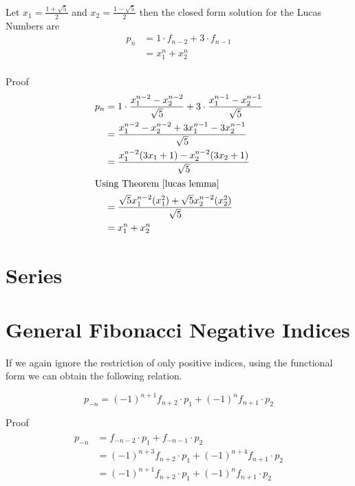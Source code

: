 \documentclass[a4paper]{article}
\begin{document}
\begin{theorem}\label{lucas closed}
Let
$x_1 = \frac{1 + \sqrt{5}}{2}$ and
$x_2 = \frac{1 - \sqrt{5}}{2}$ then
the closed form solution for the Lucas Numbers are
\begin{equation}
\begin{split}
p_n &= 1 \cdot f_{n-2} + 3 \cdot f_{n-1} \\
&= x_1^n + x_2^n  \\
\end{split}\label{eq:equation7}
\end{equation}

Proof
\begin{equation*}
\begin{split}
p_n &= 1 \cdot \frac{x_1^{n-2} - x_2^{n-2}}{\sqrt{5}} + 3 \cdot \frac{x_1^{n-1} - x_2^{n-1}}{\sqrt{5}} \\
&= \frac{x_1^{n-2} - x_2^{n-2} + 3x_1^{n-1} - 3x_2^{n-1} }{\sqrt{5}} \\
&= \frac{x_1^{n-2}(3x_1 + 1) - x_2^{n-2}(3x_2 + 1) }{\sqrt{5}} \\
\shortintertext{Using Theorem~\ref{lucas lemma}}
&= \frac{\sqrt{5} x_1^{n-2}(x_1^2) + \sqrt{5} x_2^{n-2}(x_2^2) }{\sqrt{5}} \\
&= x_1^{n} + x_2^{n}  \\
\end{split}
\end{equation*}
\end{theorem}

\section{Series}\label{sec:series}


\section{General Fibonacci Negative Indices}\label{sec:general-fibonacci-negative-indices}
If we again ignore the restriction of only positive indices, using the functional form we can obtain the following relation.

\begin{theorem}
\[
p_{-n} = (-1)^{n+1} f_{n+2} \cdot p_1 + (-1)^{n}f_{n+1} \cdot p_2
\]

Proof
\begin{gather*}
\begin{split}
p_{-n} &= f_{-n-2} \cdot p_1 + f_{-n-1} \cdot p_2 \\
    &= (-1)^{n+3} f_{n+2} \cdot p_1 + (-1)^{n+4} f_{n+1} \cdot p_2 \\
    &= (-1)^{n+1} f_{n+2} \cdot p_1 + (-1)^{n} f_{n+1} \cdot p_2 \\
\end{split}\\
\end{gather*}
\end{theorem}
\end{document}
